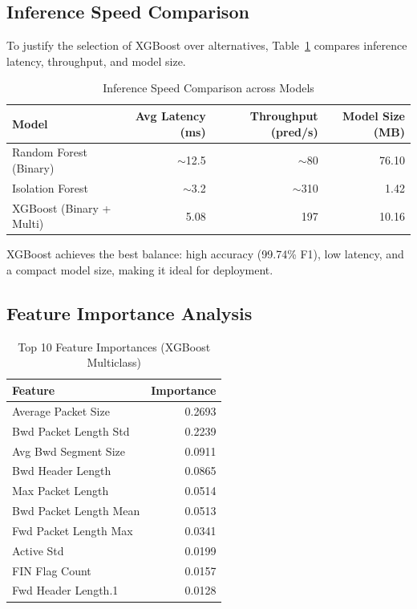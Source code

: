 \documentclass[12pt,a4paper]{article}
\begin{document}
\subsection{Inference Speed Comparison}

To justify the selection of XGBoost over alternatives, Table~\ref{tab:inference_speed} compares inference latency, throughput, and model size.

\begin{table}[H]
\centering
\caption{Inference Speed Comparison across Models}
\label{tab:inference_speed}
\begin{tabular}{|l|r|r|r|}
\hline
\textbf{Model} & \textbf{Avg Latency (ms)} & \textbf{Throughput (pred/s)} & \textbf{Model Size (MB)} \\
\hline
Random Forest (Binary) & $\sim$12.5 & $\sim$80 & 76.10 \\
Isolation Forest & $\sim$3.2 & $\sim$310 & 1.42 \\
XGBoost (Binary + Multi) & 5.08 & 197 & 10.16 \\
\hline
\end{tabular}
\end{table}

XGBoost achieves the best balance: high accuracy (99.74\% F1), low latency, and a compact model size, making it ideal for deployment.

\subsection{Feature Importance Analysis}

\begin{table}[H]
\centering
\caption{Top 10 Feature Importances (XGBoost Multiclass)}
\label{tab:feature_importance}
\begin{tabular}{|l|r|}
\hline
\textbf{Feature} & \textbf{Importance} \\
\hline
Average Packet Size & 0.2693 \\
Bwd Packet Length Std & 0.2239 \\
Avg Bwd Segment Size & 0.0911 \\
Bwd Header Length & 0.0865 \\
Max Packet Length & 0.0514 \\
Bwd Packet Length Mean & 0.0513 \\
Fwd Packet Length Max & 0.0341 \\
Active Std & 0.0199 \\
FIN Flag Count & 0.0157 \\
Fwd Header Length.1 & 0.0128 \\
\hline
\end{tabular}
\end{table}
\end{document}

